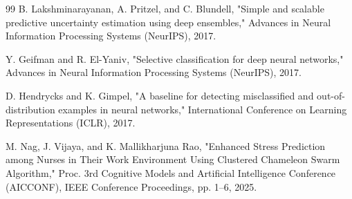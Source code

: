 \documentclass[conference]{IEEEtran}
\begin{document}
\begin{thebibliography}{99}
B. Lakshminarayanan, A. Pritzel, and C. Blundell,
"Simple and scalable predictive uncertainty estimation using deep ensembles,"
Advances in Neural Information Processing Systems (NeurIPS), 2017.

Y. Geifman and R. El-Yaniv,
"Selective classification for deep neural networks,"
Advances in Neural Information Processing Systems (NeurIPS), 2017.

D. Hendrycks and K. Gimpel,
"A baseline for detecting misclassified and out-of-distribution examples in neural networks,"
International Conference on Learning Representations (ICLR), 2017.

M. Nag, J. Vijaya, and K. Mallikharjuna Rao,
"Enhanced Stress Prediction among Nurses in Their Work Environment Using Clustered Chameleon Swarm Algorithm,"
Proc. 3rd Cognitive Models and Artificial Intelligence Conference (AICCONF), IEEE Conference Proceedings, pp. 1--6, 2025.

\end{thebibliography}
\end{document}
